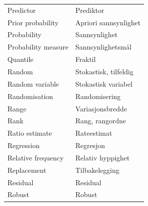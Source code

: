\begin{center}
\begin{tabular}{ll}
Predictor        & Prediktor \\
Prior probability & Apriori sannsynlighet \\
Probability      & Sannsynlighet \\
Probability measure & Sannsynlighetsmål \\
Quantile         & Fraktil \\
Random           & Stokastisk, tilfeldig \\
Random variable  & Stokastisk variabel \\
Randomisation    & Randomisering \\
Range            & Variasjonsbredde \\
Rank             & Rang, rangordne \\
Ratio estimate   & Rateestimat \\
Regression       & Regresjon \\
Relative frequency & Relativ hyppighet \\
Replacement      & Tilbakelegging \\
Residual         & Residual \\
Robust           & Robust \\
\end{tabular}
\end{center}
